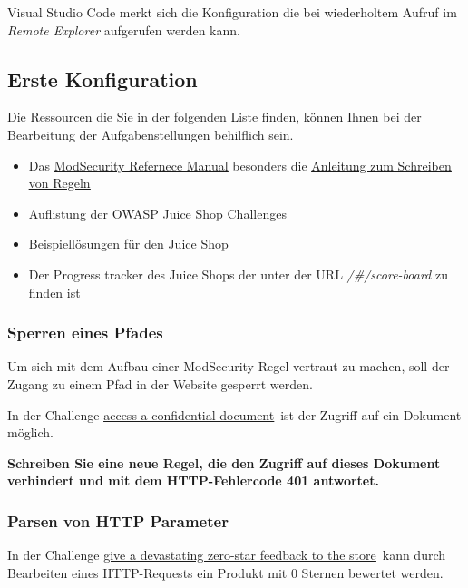Visual Studio Code merkt sich die Konfiguration die bei wiederholtem Aufruf im \textit{Remote Explorer} aufgerufen werden kann.

\subsection{Erste Konfiguration}

Die Ressourcen die Sie in der folgenden Liste finden, können Ihnen bei der Bearbeitung der Aufgabenstellungen behilflich sein.

\begin{itemize}
    \item Das \href{https://github.com/owasp-modsecurity/ModSecurity/wiki/Reference-Manual-(v3.x)}{\underline{ModSecurity Refernece Manual}} besonders die  \href{https://coreruleset.org/docs/rules/creating/}{\underline{Anleitung zum Schreiben von Regeln}}
    \item Auflistung der \href{https://pwning.owasp-juice.shop/companion-guide/latest/part2/README.html}{\underline{OWASP Juice Shop Challenges}}
    \item \href{https://github.com/refabr1k/owasp-juiceshop-solutions/tree/master}{\underline{Beispiellösungen}} für den Juice Shop
    \item Der Progress tracker des Juice Shops der unter der URL \textit{/\#/score-board} zu finden ist
\end{itemize}

\subsubsection{Sperren eines Pfades}
Um sich mit dem Aufbau einer ModSecurity Regel vertraut zu machen, soll der Zugang zu einem Pfad in der Website gesperrt werden.

In der Challenge \glqq\href{https://pwning.owasp-juice.shop/companion-guide/latest/part2/sensitive-data-exposure.html#_access_a_confidential_document}{\underline{access a confidential document}}\grqq\ ist der Zugriff auf ein Dokument möglich.

\textbf{Schreiben Sie eine neue Regel, die den Zugriff auf dieses Dokument verhindert und mit dem HTTP-Fehlercode 401 antwortet.}

\subsubsection{Parsen von HTTP Parameter}
In der Challenge \glqq\href{https://pwning.owasp-juice.shop/companion-guide/latest/part2/improper-input-validation.html#_give_a_devastating_zero_star_feedback_to_the_store}{\underline{give a devastating zero-star feedback to the store}}\grqq\ kann durch Bearbeiten eines HTTP-Requests ein Produkt mit 0 Sternen bewertet werden.

